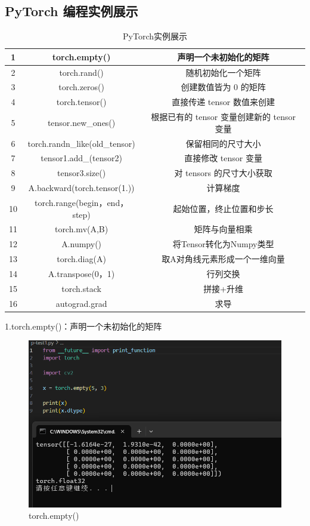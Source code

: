 \documentclass[a4paper, 12pt]{article}
\begin{document}
\subsection{PyTorch 编程实例展示}
\begin{table}[H]
\centering
\caption{ {\color{red}PyTorch实例展示}}
\begin{tabular}{ccc}
\toprule
1&torch.empty() &声明一个未初始化的矩阵   \\
\hline
2&torch.rand() & 随机初始化一个矩阵    \\ \hline
3&torch.zeros() &  创建数值皆为 0 的矩阵   \\ \hline
4&torch.tensor()& 直接传递 tensor 数值来创建    \\ \hline
 5 & tensor.new\_ones() &   根据已有的 tensor 变量创建新的 tensor 变量  \\ \hline
6& torch.randn\_like(old\_tensor) &   保留相同的尺寸大小  \\ \hline
7& tensor1.add\_(tensor2) & 直接修改 tensor 变量   \\  \hline
8& tensor3.size() &对 tensors 的尺寸大小获取  \\  \hline
9&A.backward(torch.tensor(1.)) &  计算梯度  \\ \hline
10&torch.range(begin，end，step) &   起始位置，终止位置和步长 \\ \hline
11&torch.mv(A,B) &   矩阵与向量相乘  \\ \hline
 12& A.numpy() & 将Tensor转化为Numpy类型  \\ \hline
 13&torch.diag(A) & 取A对角线元素形成一个一维向量 \\ \hline
 14&A.transpose(0，1) & 行列交换  \\ \hline
 15&torch.stack& 拼接+升维 \\ \hline
 16& autograd.grad& 求导   \\
\bottomrule
\end{tabular}
\end{table}

1.torch.empty()：声明一个未初始化的矩阵
\begin{figure}[H]
  \centering
  \includegraphics[width=\textwidth]{屏幕截图 2024-09-15 102104.png}
  \caption{torch.empty()}
\end{figure}
\end{document}

